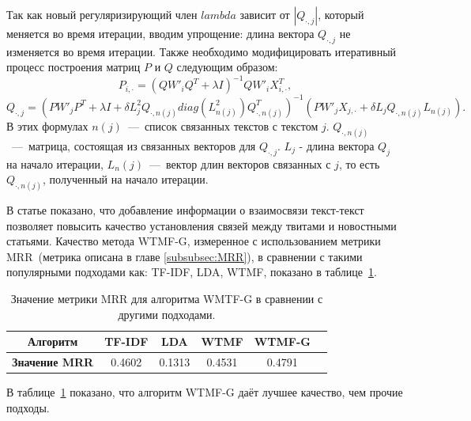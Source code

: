         Так как новый регуляризирующий член $lambda$ зависит от $|Q_{\cdot,j}|$, который меняется во время итерации, вводим упрощение: длина вектора $Q_{\cdot,j}$ не изменяется во время итерации.
        Также необходимо модифицировать итеративный процесс построения матриц $P$ и $Q$ следующим образом:
        $$P_{i, \cdot} = (Q W'_i Q^T + \lambda I)^{-1} Q W'_i X_{i,\cdot}^T,$$
        $$Q_{\cdot, j} = (P W'_j P^T + \lambda I + \delta  L_j^2 Q_{\cdot,n(j)} diag(L^2_{n(j)})Q_{\cdot,n(j)}^T)^{-1}   (P W'_j X_{j,\cdot} + \delta  L_j Q_{\cdot,n(j)} L_{n(j)}).$$
        В этих формулах $n(j)$~---~список связанных текстов с текстом $j$. $Q_{\cdot,n(j)}$~---~матрица, состоящая из связанных векторов для $Q_{\cdot, j}$.
        $L_j$ - длина вектора $Q_j$ на начало итерации, $L_n(j)$~---~вектор длин векторов связанных с $j$, то есть $Q_{\cdot,n(j)}$, полученный на начало итерации.

        В статье показано, что добавление информации о взаимосвязи текст-текст позволяет повысить качество установления связей между твитами и новостными статьями.
        Качество метода WTMF-G, измеренное с использованием метрики MRR~(метрика описана в главе \ref{subsubsec:MRR}), в сравнении с такими популярными подходами как:
        TF-IDF, LDA, WTMF, показано в таблице~\ref{tabular:wtmfg_comparing}.

        \begin{table}[ht!]
            \caption{Значение метрики MRR для алгоритма WMTF-G в сравнении с другими подходами. \bigskip}
            \centering

            \label{tabular:wtmfg_comparing}
            \begin{tabular}{|c|c|c|c|c|c|} \hline
                \bf{Алгоритм} & TF-IDF & LDA & WTMF & WTMF-G \\ \hline
                \bf{Значение MRR} & 0.4602 & 0.1313 & 0.4531 & 0.4791 \\ \hline
            \end{tabular}
        \end{table}
        В таблице~\ref{tabular:wtmfg_comparing} показано, что алгоритм WTMF-G даёт лучшее качество, чем прочие подходы.